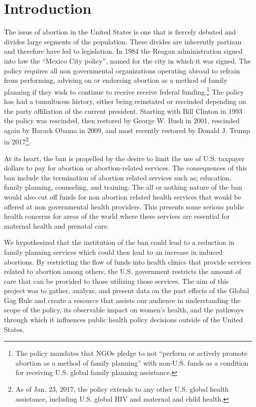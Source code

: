 \documentclass[11pt,]{article}
\begin{document}
\vskip 6.5pt

\noindent  \section{Introduction}\label{introduction}

The issue of abortion in the United States is one that is fiercely
debated and divides large segments of the population. These divides are
inherently partisan and therefore have led to legislation. In 1984 the
Reagan administration signed into law the ``Mexico City policy'', named
for the city in which it was signed. The policy requires all non
governmental organizations operating abroad to refrain from performing,
advising on or endorsing abortion as a method of family planning if they
wish to continue to receive receive federal funding.\footnote{The policy
  mandates that NGOs pledge to not ``perform or actively promote
  abortion as a method of family planning'' with non-U.S. funds as a
  condition for receiving U.S. global family planning assistance.} The
policy has had a tumultuous history, either being reinstated or
rescinded depending on the party affiliation of the current president.
Starting with Bill Clinton in 1993 the policy was rescinded, then
restored by George W. Bush in 2001, rescinded again by Barack Obama in
2009, and most recently restored by Donald J. Trump in 2017\footnote{As
  of Jan. 23, 2017, the policy extends to any other U.S. global health
  assistance, including U.S. global HIV and maternal and child health.}.

At its heart, the ban is propelled by the desire to limit the use of
U.S. taxpayer dollars to pay for abortion or abortion-related services.
The consequences of this ban include the termination of abortion related
services such as; education, family planning, counseling, and training.
The all or nothing nature of the ban would also cut off funds for non
abortion related health services that would be offered at non
governmental health providers. This presents some serious public health
concerns for areas of the world where these services are essential for
maternal health and prenatal care.

We hypothesized that the institution of the ban could lead to a
reduction in family planning services which could then lead to an
increase in induced abortions. By restricting the flow of funds into
health clinics that provide services related to abortion among others,
the U.S. government restricts the amount of care that can be provided to
those utilizing those services. The aim of this project was to gather,
analyze, and present data on the past effects of the Global Gag Rule and
create a resource that assists our audience in understanding the scope
of the policy, its observable impact on women's health, and the pathways
through which it influences public health policy decisions outside of
the United States.
\end{document}
